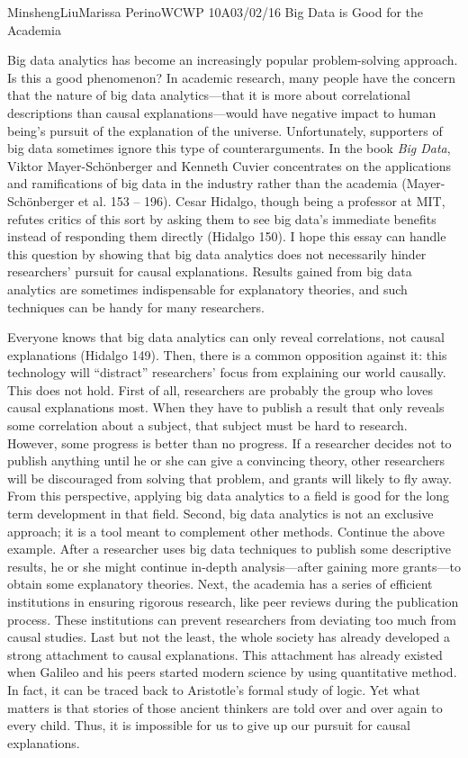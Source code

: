 \documentclass[12pt,letterpaper]{article}
\begin{document}
\begin{mla}{Minsheng}{Liu}{Marissa Perino}{WCWP 10A}{03/02/16}
  {Big Data is Good for the Academia}

Big data analytics has become an increasingly popular problem-solving
approach. Is this a good phenomenon? In academic research, many people
have the concern that the nature of big data analytics---that it is more
about correlational descriptions than causal explanations---would have
negative impact to human being's pursuit of the explanation of the
universe. Unfortunately, supporters of big data sometimes ignore this
type of counterarguments. In the book \emph{Big Data}, Viktor
Mayer-Schönberger and Kenneth Cuvier concentrates on the applications
and ramifications of big data in the industry rather than the academia
(Mayer-Schönberger et al. 153 -- 196). Cesar Hidalgo, though being a
professor at MIT, refutes critics of this sort by asking them to see big
data's immediate benefits instead of responding them directly (Hidalgo
150). I hope this essay can handle this question by showing that big
data analytics does not necessarily hinder researchers' pursuit for
causal explanations. Results gained from big data analytics are
sometimes indispensable for explanatory theories, and such techniques
can be handy for many researchers.

Everyone knows that big data analytics can only reveal correlations, not
causal explanations (Hidalgo 149). Then, there is a common opposition
against it: this technology will ``distract'' researchers' focus from
explaining our world causally. This does not hold. First of all,
researchers are probably the group who loves causal explanations most.
When they have to publish a result that only reveals some correlation
about a subject, that subject must be hard to research. However, some
progress is better than no progress. If a researcher decides not to
publish anything until he or she can give a convincing theory, other
researchers will be discouraged from solving that problem, and grants
will likely to fly away. From this perspective, applying big data
analytics to a field is good for the long term development in that
field. Second, big data analytics is not an exclusive approach; it is a
tool meant to complement other methods. Continue the above example.
After a researcher uses big data techniques to publish some descriptive
results, he or she might continue in-depth analysis---after gaining more
grants---to obtain some explanatory theories. Next, the academia has a
series of efficient institutions in ensuring rigorous research, like
peer reviews during the publication process. These institutions can
prevent researchers from deviating too much from causal studies. Last
but not the least, the whole society has already developed a strong
attachment to causal explanations. This attachment has already existed
when Galileo and his peers started modern science by using quantitative
method. In fact, it can be traced back to Aristotle's formal study of
logic. Yet what matters is that stories of those ancient thinkers are
told over and over again to every child. Thus, it is impossible for us
to give up our pursuit for causal explanations.


\end{mla}
\end{document}
